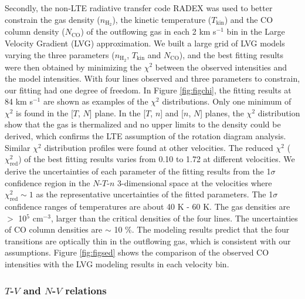 Secondly, the non-LTE radiative transfer code RADEX \citep{2007A&A...468..627V} was used to better constrain the gas density ($n_{\mathrm{H}_2}$), the kinetic temperature ($T_{\mathrm{kin}}$) and the CO column density ($N_{\mathrm{CO}}$) of the outflowing gas in each 2 km s$^{-1}$ bin in the Large Velocity Gradient (LVG) approximation. We built a large grid of LVG models varying the three parameters ($n_{\mathrm{H}_2}$, $T_{\mathrm{kin}}$ and $N_{\mathrm{CO}}$), and the best fitting results were then obtained by minimizing the $\chi^2$ between the observed intensities and the model intensities. With four lines observed and three parameters to constrain, our fitting had one degree of freedom. In Figure \ref{fig:figchi}, the fitting results at 84 km s$^{-1}$ are shown as examples of the $\chi^2$ distributions. Only one minimum of $\chi^2$ is found in the [$T$, $N$] plane. In the [$T$, $n$] and [$n$, $N$] planes, the $\chi^2$ distribution show that the gas is thermalized and no upper limits to the density could be derived, which confirms the LTE assumption of the rotation diagram analysis. Similar $\chi^2$ distribution profiles were found at other velocities. The reduced $\chi^2$ ($\chi^2_{\mathrm{red}}$) of the best fitting results varies from 0.10 to 1.72 at different velocities. We derive the uncertainties of each parameter of the fitting results from the 1$\sigma$ confidence region in the $N$-$T$-$n$ 3-dimensional space at the velocities where $\chi^2_{\mathrm{red}} \sim 1$ as the representative uncertainties of the fitted parameters. The 1$\sigma$ confidence ranges of temperatures are about 40 K - 60 K. The gas densities are $>$ 10$^5$ cm$^{-3}$, larger than the critical densities of the four lines. The uncertainties of CO column densities are $\sim$ 10 \%. The modeling results predict that the four transitions are optically thin in the outflowing gas, which is consistent with our assumptions. Figure \ref{fig:figsed} shows the comparison of the observed CO intensities with the LVG modeling results in each velocity bin. 

\subsubsection{$T$-$V$ and $N$-$V$ relations}

